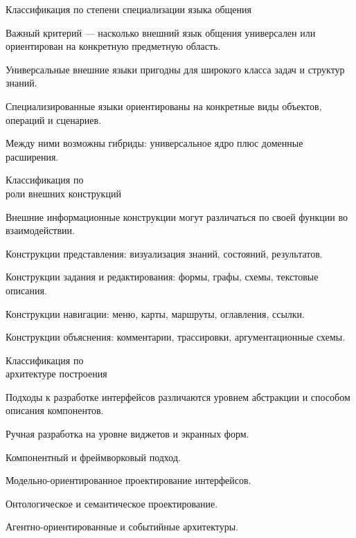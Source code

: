 \begin{frame}{Классификация по степени специализации языка общения}
	\topline
	\justifying

	Важный критерий --- насколько внешний язык общения универсален или ориентирован на конкретную предметную область.
	
	\begin{textitemize}
		\item Универсальные внешние языки пригодны для широкого класса задач и структур знаний.
		\item Специализированные языки ориентированы на конкретные виды объектов, операций и сценариев.
		\item Между ними возможны гибриды: универсальное ядро плюс доменные расширения.
	\end{textitemize}
\end{frame}

\begin{frame}{Классификация по\\ роли внешних конструкций}
	\topline
	\justifying

	Внешние информационные конструкции могут различаться по своей функции во взаимодействии.
	
	\begin{textitemize}
		\item Конструкции представления: визуализация знаний, состояний, результатов.
		\item Конструкции задания и редактирования: формы, графы, схемы, текстовые описания.
		\item Конструкции навигации: меню, карты, маршруты, оглавления, ссылки.
		\item Конструкции объяснения: комментарии, трассировки, аргументационные схемы.
	\end{textitemize}
\end{frame}

\begin{frame}{Классификация по\\ архитектуре построения}
	\topline
	\justifying

	Подходы к разработке интерфейсов различаются уровнем абстракции и способом описания компонентов.
	
	\begin{textitemize}
		\item Ручная разработка на уровне виджетов и экранных форм.
		\item Компонентный и фреймворковый подход.
		\item Модельно-ориентированное проектирование интерфейсов.
		\item Онтологическое и семантическое проектирование.
		\item Агентно-ориентированные и событийные архитектуры.
	\end{textitemize}
\end{frame}

